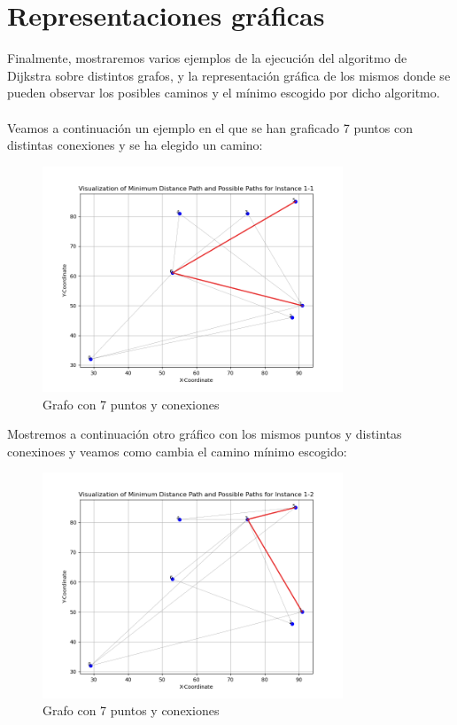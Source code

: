 \documentclass[11pt,openany]{book}
\begin{document}
\section{Representaciones gráficas}
Finalmente, mostraremos varios ejemplos de la ejecución del algoritmo de Dijkstra sobre distintos grafos, y la representación gráfica de los mismos
 donde se pueden observar los posibles caminos y el mínimo escogido por dicho algoritmo.\\ \\
Veamos a continuación un ejemplo en el que se han graficado 7 puntos con distintas conexiones y se ha elegido un camino:
\begin{figure}[H]
      \centering
      \includegraphics[width=0.8\textwidth]{assets/Img/GraficaCaminoMinimo-1-1.png}
      \caption{Grafo con 7 puntos y conexiones}
\end{figure}
Mostremos a continuación otro gráfico con los mismos puntos y distintas conexinoes y veamos como cambia el camino
mínimo escogido:
\begin{figure}[H]
      \centering
      \includegraphics[width=0.8\textwidth]{assets/Img/GraficaCaminoMinimo-1-2.png}
      \caption{Grafo con 7 puntos y conexiones}
\end{figure}
\end{document}
